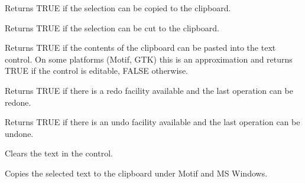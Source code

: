 
\label{wxtextctrlcancopy}


Returns TRUE if the selection can be copied to the clipboard.

\label{wxtextctrlcancut}


Returns TRUE if the selection can be cut to the clipboard.

\label{wxtextctrlcanpaste}


Returns TRUE if the contents of the clipboard can be pasted into the
text control. On some platforms (Motif, GTK) this is an approximation
and returns TRUE if the control is editable, FALSE otherwise.

\label{wxtextctrlcanredo}


Returns TRUE if there is a redo facility available and the last operation
can be redone.

\label{wxtextctrlcanundo}


Returns TRUE if there is an undo facility available and the last operation
can be undone.

\label{wxtextctrlclear}


Clears the text in the control.

\label{wxtextctrlcopy}


Copies the selected text to the clipboard under Motif and MS Windows.

\label{wxtextctrlcreate}


